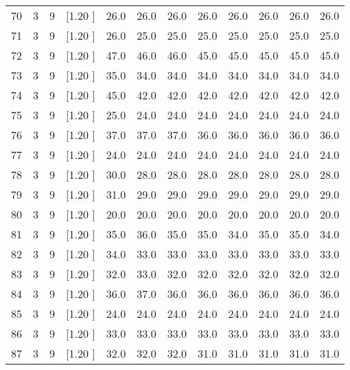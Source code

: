 \documentclass[12pt,a4paper]{article}
\begin{document}
\begin{center}
{\begin{tabular}{r r r r r r r r r r r r}
  70&  3&  9&[1.20      ]&    26.0&    26.0&    26.0&    26.0&    26.0&    26.0&    26.0&    26.0\\[-0.02in]
  71&  3&  9&[1.20      ]&    26.0&    25.0&    25.0&    25.0&    25.0&    25.0&    25.0&    25.0\\[-0.02in]
  72&  3&  9&[1.20      ]&    47.0&    46.0&    46.0&    45.0&    45.0&    45.0&    45.0&    45.0\\[-0.02in]
  73&  3&  9&[1.20      ]&    35.0&    34.0&    34.0&    34.0&    34.0&    34.0&    34.0&    34.0\\[-0.02in]
  74&  3&  9&[1.20      ]&    45.0&    42.0&    42.0&    42.0&    42.0&    42.0&    42.0&    42.0\\[-0.02in]
  75&  3&  9&[1.20      ]&    25.0&    24.0&    24.0&    24.0&    24.0&    24.0&    24.0&    24.0\\[-0.02in]
  76&  3&  9&[1.20      ]&    37.0&    37.0&    37.0&    36.0&    36.0&    36.0&    36.0&    36.0\\[-0.02in]
  77&  3&  9&[1.20      ]&    24.0&    24.0&    24.0&    24.0&    24.0&    24.0&    24.0&    24.0\\[-0.02in]
  78&  3&  9&[1.20      ]&    30.0&    28.0&    28.0&    28.0&    28.0&    28.0&    28.0&    28.0\\[-0.02in]
  79&  3&  9&[1.20      ]&    31.0&    29.0&    29.0&    29.0&    29.0&    29.0&    29.0&    29.0\\[-0.02in]
  80&  3&  9&[1.20      ]&    20.0&    20.0&    20.0&    20.0&    20.0&    20.0&    20.0&    20.0\\[-0.02in]
  81&  3&  9&[1.20      ]&    35.0&    36.0&    35.0&    35.0&    34.0&    35.0&    35.0&    34.0\\[-0.02in]
  82&  3&  9&[1.20      ]&    34.0&    33.0&    33.0&    33.0&    33.0&    33.0&    33.0&    33.0\\[-0.02in]
  83&  3&  9&[1.20      ]&    32.0&    33.0&    32.0&    32.0&    32.0&    32.0&    32.0&    32.0\\[-0.02in]
  84&  3&  9&[1.20      ]&    36.0&    37.0&    36.0&    36.0&    36.0&    36.0&    36.0&    36.0\\[-0.02in]
  85&  3&  9&[1.20      ]&    24.0&    24.0&    24.0&    24.0&    24.0&    24.0&    24.0&    24.0\\[-0.02in]
  86&  3&  9&[1.20      ]&    33.0&    33.0&    33.0&    33.0&    33.0&    33.0&    33.0&    33.0\\[-0.02in]
  87&  3&  9&[1.20      ]&    32.0&    32.0&    32.0&    31.0&    31.0&    31.0&    31.0&    31.0\\[-0.02in]

\end{tabular}}
\end{center}
\end{document}
